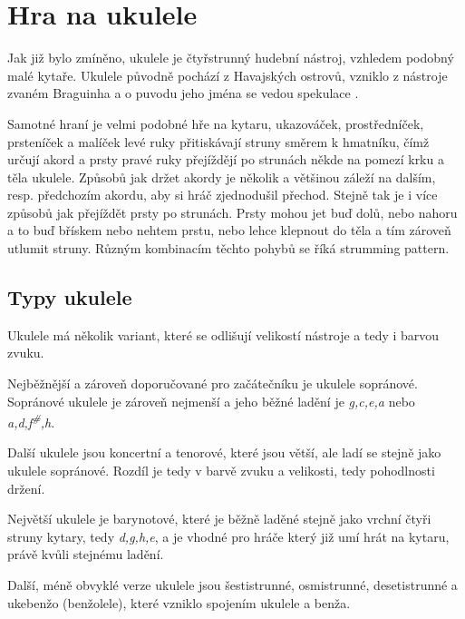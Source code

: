 \section{Hra na ukulele}
\label{sc:ukulele_playing}
Jak již bylo zmíněno, ukulele je čtyřstrunný hudební nástroj, vzhledem podobný malé kytaře. Ukulele původně pochází z Havajských ostrovů, vzniklo z nástroje zvaném Braguinha a o puvodu jeho jména se vedou spekulace \cite{rek_2008_kola}.

Samotné hraní je velmi podobné hře na kytaru, ukazováček, prostředníček, prsteníček a malíček levé ruky přitiskávají struny směrem k hmatníku, čímž určují akord a prsty pravé ruky přejíždějí po strunách někde na pomezí krku a těla ukulele. Způsobů jak držet akordy je několik a většinou záleží na dalším, resp. předchozím akordu, aby si hráč zjednodušil přechod. Stejně tak je i více způsobů jak přejíždět prsty po strunách. Prsty mohou jet buď dolů, nebo nahoru a to buď břískem nebo nehtem prstu, nebo lehce klepnout do těla a tím zároveň utlumit struny. Různým kombinacím těchto pohybů se říká \gls{strumming pattern}.

\subsection{Typy ukulele}
\label{ss:ukulele_types}
Ukulele má několik variant, které se odlišují velikostí nástroje a tedy i barvou zvuku.

Nejběžnější a zároveň doporučované pro začátečníku je ukulele sopránové. Sopránové ukulele je zároveň nejmenší a jeho běžné ladění je \textit{g,c,e,a} nebo \textit{a,d,f\textsuperscript{\#},h}.

Další ukulele jsou koncertní a tenorové, které jsou větší, ale ladí se stejně jako ukulele sopránové. Rozdíl je tedy v barvě zvuku a velikosti, tedy pohodlnosti držení.

Největší ukulele je barynotové, které je běžně laděné stejně jako vrchní čtyři struny kytary, tedy \textit{d,g,h,e}, a je vhodné pro hráče který již umí hrát na kytaru, právě kvůli stejnému ladění.

Další, méně obvyklé verze ukulele jsou šestistrunné, osmistrunné, desetistrunné a ukebenžo (benžolele), které vzniklo spojením ukulele a benža.
